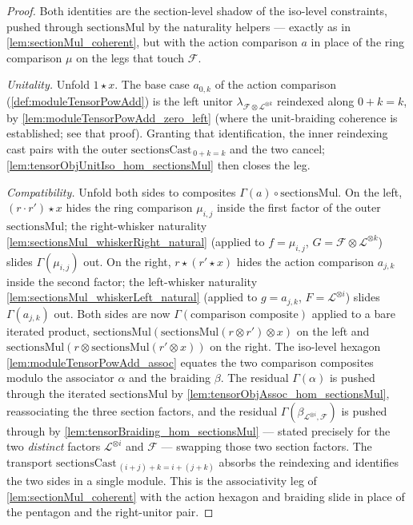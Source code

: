 \begin{proof}
  Both identities are the section-level shadow of the iso-level constraints, pushed
  through \(\mathrm{sectionsMul}\) by the naturality helpers --- exactly as in
  \cref{lem:sectionMul_coherent}, but with the action comparison \(a\) in place of
  the ring comparison \(\mu\) on the legs that touch \(\mathcal{F}\).

  \emph{Unitality.} Unfold \(1\star x\). The base case \(a_{0,k}\) of the action
  comparison (\cref{def:moduleTensorPowAdd}) is the left unitor
  \(\lambda_{\mathcal{F}\otimes\mathcal{L}^{\otimes k}}\) reindexed along \(0+k=k\),
  by \cref{lem:moduleTensorPowAdd_zero_left} (where the unit-braiding coherence is
  established; see that proof). Granting that identification, the inner
  reindexing cast pairs with the outer \(\mathrm{sectionsCast}_{\,0+k=k}\) and the two
  cancel; \cref{lem:tensorObjUnitIso_hom_sectionsMul} then closes the leg.

  \emph{Compatibility.} Unfold both sides to composites
  \(\Gamma(a)\circ\mathrm{sectionsMul}\). On the left, \((r\cdot r')\star x\) hides
  the ring comparison \(\mu_{i,j}\) inside the first factor of the outer
  \(\mathrm{sectionsMul}\); the right-whisker naturality
  \cref{lem:sectionsMul_whiskerRight_natural} (applied to \(f=\mu_{i,j}\),
  \(G=\mathcal{F}\otimes\mathcal{L}^{\otimes k}\)) slides \(\Gamma(\mu_{i,j})\) out.
  On the right, \(r\star(r'\star x)\) hides the action comparison \(a_{j,k}\) inside
  the second factor; the left-whisker naturality
  \cref{lem:sectionsMul_whiskerLeft_natural} (applied to \(g=a_{j,k}\),
  \(F=\mathcal{L}^{\otimes i}\)) slides \(\Gamma(a_{j,k})\) out. Both sides are now
  \(\Gamma(\text{comparison composite})\) applied to a bare iterated product,
  \(\mathrm{sectionsMul}(\mathrm{sectionsMul}(r\otimes r')\otimes x)\) on the left and
  \(\mathrm{sectionsMul}(r\otimes\mathrm{sectionsMul}(r'\otimes x))\) on the right.
  The iso-level hexagon \cref{lem:moduleTensorPowAdd_assoc} equates the two
  comparison composites modulo the associator \(\alpha\) and the braiding \(\beta\).
  The residual \(\Gamma(\alpha)\) is pushed through the iterated
  \(\mathrm{sectionsMul}\) by \cref{lem:tensorObjAssoc_hom_sectionsMul},
  reassociating the three section factors, and the residual
  \(\Gamma(\beta_{\mathcal{L}^{\otimes i},\mathcal{F}})\) is pushed through by
  \cref{lem:tensorBraiding_hom_sectionsMul} --- stated precisely for the two
  \emph{distinct} factors \(\mathcal{L}^{\otimes i}\) and \(\mathcal{F}\) --- swapping
  those two section factors. The transport
  \(\mathrm{sectionsCast}_{\,(i+j)+k=i+(j+k)}\) absorbs the reindexing and identifies
  the two sides in a single module. This is the associativity leg of
  \cref{lem:sectionMul_coherent} with the action hexagon and braiding slide in place
  of the pentagon and the right-unitor pair.
\end{proof}

